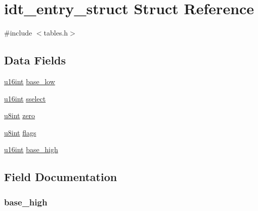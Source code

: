 \hypertarget{structidt__entry__struct}{}\section{idt\+\_\+entry\+\_\+struct Struct Reference}
\label{structidt__entry__struct}


{\ttfamily \#include $<$tables.\+h$>$}

\subsection*{Data Fields}
\begin{DoxyCompactItemize}
\item 
\hyperlink{system_8h_a863d9497073aad2b991aeab2211d87af}{u16int} \hyperlink{structidt__entry__struct_a0a776dced2c26f16298425cde39f8364}{base\+\_\+low}
\item 
\hyperlink{system_8h_a863d9497073aad2b991aeab2211d87af}{u16int} \hyperlink{structidt__entry__struct_ab3f34507900160b4a9b309b4ed039e07}{sselect}
\item 
\hyperlink{system_8h_a1026e682ffdadc1701c42cd44ce9efcf}{u8int} \hyperlink{structidt__entry__struct_a94515e42687e7508877c09da81f86860}{zero}
\item 
\hyperlink{system_8h_a1026e682ffdadc1701c42cd44ce9efcf}{u8int} \hyperlink{structidt__entry__struct_a138dda98fcd4738346af61bcca8cf4b4}{flags}
\item 
\hyperlink{system_8h_a863d9497073aad2b991aeab2211d87af}{u16int} \hyperlink{structidt__entry__struct_aa5444beb10d8cdc1d75a18d338f1b3ea}{base\+\_\+high}
\end{DoxyCompactItemize}


\subsection{Field Documentation}
\subsubsection[{\texorpdfstring{base\+\_\+high}{base_high}}]{ base\+\_\+high}\hypertarget{structidt__entry__struct_aa5444beb10d8cdc1d75a18d338f1b3ea}{}\label{structidt__entry__struct_aa5444beb10d8cdc1d75a18d338f1b3ea}
